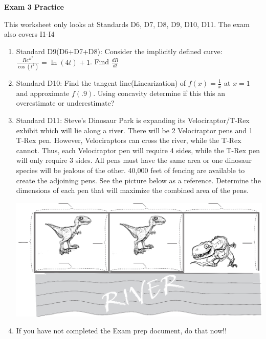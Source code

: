 \documentclass[12pt]{article}
\begin{document}
\textbf{Exam 3 Practice}


\normalsize 

\vspace{.4cm}
This worksheet only looks at Standards D6, D7, D8, D9, D10, D11. The exam also covers I1-I4
\begin{enumerate}
    \item Standard D9(D6+D7+D8): Consider the implicitly defined curve: 
    $\displaystyle{\frac{Re^{R^2}}{\cos(t^2)}=\ln(4t)+1}$. Find $\frac{dR}{dt}$
    \vfill
    \item Standard D10: Find the tangent line(Linearization) of $f(x)=\frac{1}{x}$ at $x=1$ and approximate $f(.9)$. Using concavity determine if this this an overestimate or underestimate?
    \vspace{5.5cm}
    \newpage
    \item Standard D11: Steve's Dinosaur Park is expanding its Velociraptor/T-Rex exhibit which will lie along a river. There will be 2 Velociraptor pens and 1 T-Rex pen. However, Velociraptors can cross the river, while the T-Rex cannot. Thus, each Velociraptor pen will require 4 sides, while the T-Rex pen will only require 3 sides. All pens must have the same area or one dinosaur species will be jealous of the other. 40,000 feet of fencing are available to create the adjoining pens. See the picture below as a reference. Determine the dimensions of each pen that will maximize the combined area of the pens.  

	\includegraphics[scale=0.4]{optimization_img_ALT.png}
    \vfill
    \item If you have not completed the Exam prep document, do that now!!
\end{enumerate}
\end{document}
